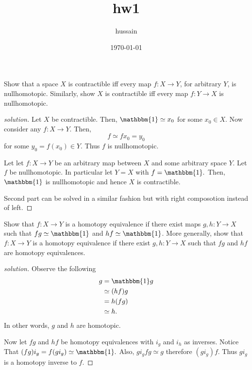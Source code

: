 \documentclass{article}
\title{hw1}
\author{hussain}
\date{\today}
\newcommand{\1}{\mathbbm{1}}
\newenvironment{problem}[2][Problem]{\begin{trivlist}
\item[\hskip \labelsep {\bfseries #1}\hskip \labelsep {\bfseries #2.}]}{\end{trivlist}}
\begin{document}
\maketitle
\begin{problem}{2}
    Show that a space $X$ is contractible iff every map $f : X \longrightarrow Y$, for
    arbitrary $Y$, is nullhomotopic. Similarly, show $X$ is contractible iff
    every map $f : Y \longrightarrow X$ is nullhomotopic.
\end{problem}

\begin{proof}[solution]
    Let $X$ be contractible. Then, $\1 \simeq x_0$ for some $x_0 \in X.$ Now consider any $f:X \longrightarrow Y.$ Then, 
    \[
    f \simeq fx_0 = y_0     
    \]
    for some $y_0 = f(x_0) \in Y.$ Thus $f$ is nullhomotopic.

    Let let $f : X \longrightarrow Y$ be an arbitrary map between $X$ and some arbitrary space $Y.$ Let $f$ be nullhomotopic. In particular let $Y = X$ with $f = \1.$ Then, $\1$ is nullhomotopic and hence $X$ is contractible.

    Second part can be solved in a similar fashion but with right composotion instead of left. 
\end{proof}
\begin{problem}{3}
    Show that $f : X \longrightarrow Y$ is a homotopy equivalence if there exist maps $g, h : Y \longrightarrow X$ such that $fg \simeq \1$ and $hf \simeq \1$. More generally, show that $f : X \longrightarrow Y$ is a homotopy equivalence if there exist $g, h : Y \longrightarrow X$ such that $fg$ and $hf$ are homotopy equivalences.
\end{problem}
\begin{proof}[solution]
    Observe the following
    \begin{align*}
        g 
        &= \1 g \\
        &\simeq (hf)g \\
        &= h(fg) \\
        &\simeq h.
    \end{align*}
    In other words, $g$ and $h$ are homotopic. 
    
    Now let $fg$ and $hf$ be homotopy equivalences with $i_g$ and $i_h$ as inverses. Notice That $(fg)i_g = f(gi_g) \simeq \1.$ Also, $gi_gfg \simeq g$ therefore $(gi_g)f.$ Thus $gi_g$ is a homotopy inverse to $f.$
\end{proof}
\end{document}
